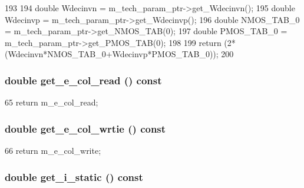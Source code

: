 \begin{DoxyCode}
193 {
194     double Wdecinvn = m_tech_param_ptr->get_Wdecinvn();
195     double Wdecinvp = m_tech_param_ptr->get_Wdecinvp();
196     double NMOS_TAB_0 = m_tech_param_ptr->get_NMOS_TAB(0);
197     double PMOS_TAB_0 = m_tech_param_ptr->get_PMOS_TAB(0);
198 
199     return (2*(Wdecinvn*NMOS_TAB_0+Wdecinvp*PMOS_TAB_0));
200 }
\end{DoxyCode}
\hypertarget{classBitlineUnit_a665e8335005e4c818305cbdbcaa3e5a4}{
\subsubsection[{get\_\-e\_\-col\_\-read}]{\setlength{\rightskip}{0pt plus 5cm}double get\_\-e\_\-col\_\-read () const}}
\label{classBitlineUnit_a665e8335005e4c818305cbdbcaa3e5a4}



\begin{DoxyCode}
65 { return m_e_col_read; }
\end{DoxyCode}
\hypertarget{classBitlineUnit_a7936403fd082763cb36ad6de7147cf4c}{
\subsubsection[{get\_\-e\_\-col\_\-wrtie}]{\setlength{\rightskip}{0pt plus 5cm}double get\_\-e\_\-col\_\-wrtie () const}}
\label{classBitlineUnit_a7936403fd082763cb36ad6de7147cf4c}



\begin{DoxyCode}
66 { return m_e_col_write; }
\end{DoxyCode}
\hypertarget{classBitlineUnit_af4ce13e52cccc034f4f0bb0f0a6c9468}{
\subsubsection[{get\_\-i\_\-static}]{\setlength{\rightskip}{0pt plus 5cm}double get\_\-i\_\-static () const}}
\label{classBitlineUnit_af4ce13e52cccc034f4f0bb0f0a6c9468}




